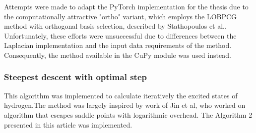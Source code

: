 Attempts were made to adapt the PyTorch implementation\cite{torch_lobpcg} for the thesis due to the computationally attractive "ortho" variant, which employs the LOBPCG method with orthogonal basis selection, described by Stathopoulos et al.\cite{stathopoulous2002}. Unfortunately, these efforts were unsuccessful due to differences between the Laplacian implementation and the input data requirements of the method. Consequently, the method available in the CuPy module was used instead.\cite{cupy_lobpcg}

\subsubsection{Steepest descent with optimal step}
This algorithm was implemented to calculate iteratively the excited states of hydrogen.The method was largely inspired by work of Jin et al, who worked on algorithm that escapes saddle points with logarithmic overhead. The Algorithm 2 presented in this article was implemented.\cite{pgd}

